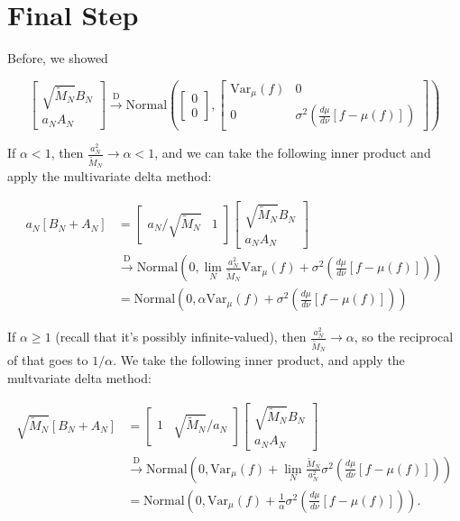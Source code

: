 \documentclass{article}
\begin{document}
\section{Final Step}

Before, we showed

$$
\begin{bmatrix}
\sqrt{\tilde{M}_N} B_N \\
a_N A_N
\end{bmatrix}
\overset{\text{D}}{\to}
\text{Normal}\left( 
\begin{bmatrix}
0 \\
0
\end{bmatrix},
\begin{bmatrix}
\text{Var}_{\mu}(f) & 0 \\
0 & \sigma^2\left( \frac{d\mu}{d\nu}\left[f - \mu(f) \right] \right)
\end{bmatrix}
\right)
$$

If $\alpha < 1$, then $\frac{a_N^2}{\tilde{M}_N} \to \alpha < 1$, and we can take the following inner product and apply the multivariate delta method:

\begin{align*}
a_N \left[ B_N + A_N    \right] 
&= 
\begin{bmatrix}
a_N / \sqrt{\tilde{M}_N} & 1  
\end{bmatrix}
\begin{bmatrix}
\sqrt{\tilde{M}_N} B_N \\
a_N A_N
\end{bmatrix} \\
& \overset{\text{D}}{\to}
\text{Normal}\left( 
0,
\lim_N \frac{a_N^2}{\tilde{M}_N}\text{Var}_{\mu}(f) + \sigma^2\left( \frac{d\mu}{d\nu}\left[f - \mu(f) \right] \right)
\right) \\
&= \text{Normal}\left( 
0,
\alpha \text{Var}_{\mu}(f) +  \sigma^2\left( \frac{d\mu}{d\nu}\left[f - \mu(f) \right] \right)
\right)
\end{align*}


If $\alpha \ge 1$ (recall that it's possibly infinite-valued), then $\frac{a_N^2}{\tilde{M}_N} \to \alpha$, so the reciprocal of that goes to $1/\alpha$. We take the following inner product, and apply the multvariate delta method:

\begin{align*}
\sqrt{\tilde{M}_N} \left[ B_N + A_N    \right] 
&= 
\begin{bmatrix}
1 & \sqrt{\tilde{M}_N}/a_N
\end{bmatrix}
\begin{bmatrix}
\sqrt{\tilde{M}_N} B_N \\
a_N A_N
\end{bmatrix} \\
& \overset{\text{D}}{\to}
\text{Normal}\left( 
0,
\text{Var}_{\mu}(f) + \lim_N \frac{\tilde{M}_N}{a_N^2}\sigma^2\left( \frac{d\mu}{d\nu}\left[f - \mu(f) \right] \right)
\right) \\
&= \text{Normal}\left( 
0,
\text{Var}_{\mu}(f) + \frac{1}{\alpha} \sigma^2\left( \frac{d\mu}{d\nu}\left[f - \mu(f) \right] \right)
\right).
\end{align*}
\end{document}
